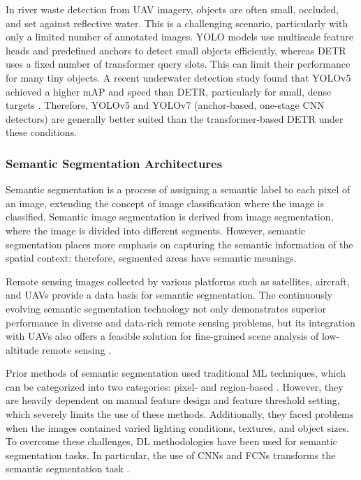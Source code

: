 \documentclass{ieeeaccess}
\begin{document}
In river waste detection from UAV imagery, objects are often small, occluded, and set against reflective water. This is a challenging scenario, particularly with only a limited number of annotated images. YOLO models use multiscale feature heads and predefined anchors to detect small objects efficiently, whereas DETR uses a fixed number of transformer query slots. This can limit their performance for many tiny objects. A recent underwater detection study found that YOLOv5 achieved a higher mAP and speed than DETR, particularly for small, dense targets \cite{yuan2023performance}. Therefore, YOLOv5 and YOLOv7 (anchor-based, one-stage CNN detectors) are generally better suited than the transformer-based DETR under these conditions.


\vspace{0.3cm}
\subsubsection{Semantic Segmentation Architectures}

Semantic segmentation is a process of assigning a semantic label to each pixel of an image, extending the concept of image classification where the image is classified.
Semantic image segmentation is derived from image segmentation, where the image is divided into different segments.
However, semantic segmentation places more emphasis on capturing the semantic information of the spatial context; therefore, segmented areas have semantic meanings.

Remote sensing images collected by various platforms such as satellites, aircraft, and UAVs \cite{Toth2016RemoteSP, Bhardwaj2016UAVsAR} provide a data basis for semantic segmentation. The continuously evolving semantic segmentation technology not only demonstrates superior performance in diverse and data-rich remote sensing problems, but its integration with UAVs also offers a feasible solution for fine-grained scene analysis of low-altitude remote sensing \cite{Bhardwaj2016UAVsAR, Toth2016RemoteSP, Steenbeek2022CNNBasedDM}. 

Prior methods of semantic segmentation used traditional ML techniques, which can be categorized into two categories: pixel- and region-based \cite{Weinland2011ASO}. 
However, they are heavily dependent on manual feature design and feature threshold setting, which severely limits the use of these methods.
Additionally, they faced problems when the images contained varied lighting conditions, textures, and object sizes. To overcome these challenges, DL methodologies have been used for semantic segmentation tasks.
In particular, the use of CNNs and FCNs transforms the semantic segmentation task \cite{Guo2017ARO}.
\end{document}
